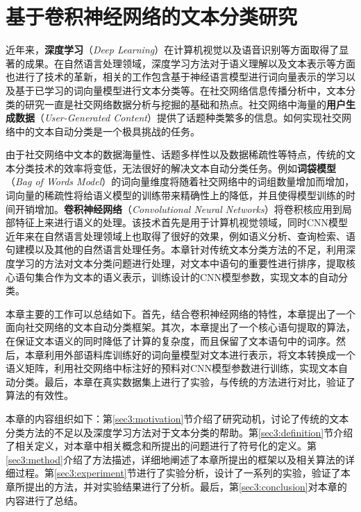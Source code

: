 \chapter{基于卷积神经网络的文本分类研究}
近年来，\textbf{深度学习}（\textit{Deep Learning}）在计算机视觉以及语音识别等方面取得了显著的成果。在自然语言处理领域，深度学习方法对于语义理解以及文本表示等方面也进行了技术的革新，相关的工作包含基于神经语言模型进行词向量表示的学习以及基于已学习的词向量模型进行文本分类等。在社交网络信息传播分析中，文本分类的研究一直是社交网络数据分析与挖掘的基础和热点。社交网络中海量的\textbf{用户生成数据}（\textit{User-Generated Content}）提供了话题种类繁多的信息。如何实现社交网络中的文本自动分类是一个极具挑战的任务。

由于社交网络中文本的数据海量性、话题多样性以及数据稀疏性等特点，传统的文本分类技术的效率将变低，无法很好的解决文本自动分类任务。例如\textbf{词袋模型}（\textit{Bag of Words Model}）的词向量维度将随着社交网络中的词组数量增加而增加，词向量的稀疏性将给语义模型的训练带来精确性上的降低，并且使得模型训练的时间开销增加。\textbf{卷积神经网络}（\textit{Convolutional Neural Networks}）将卷积核应用到局部特征上来进行语义的处理。该技术首先是用于计算机视觉领域，同时CNN模型近年来在自然语言处理领域上也取得了很好的效果，例如语义分析、查询检索、语句建模以及其他的自然语言处理任务。本章针对传统文本分类方法的不足，利用深度学习的方法对文本分类问题进行处理，对文本中语句的重要性进行排序，提取核心语句集合作为文本的语义表示，训练设计的CNN模型参数，实现文本的自动分类。

本章主要的工作可以总结如下。首先，结合卷积神经网络的特性，本章提出了一个面向社交网络的文本自动分类框架。其次，本章提出了一个核心语句提取的算法，在保证文本语义的同时降低了计算的复杂度，而且保留了文本语句中的词序。然后，本章利用外部语料库训练好的词向量模型对文本进行表示，将文本转换成一个语义矩阵，利用社交网络中标注好的预料对CNN模型参数进行训练，实现文本自动分类。最后，本章在真实数据集上进行了实验，与传统的方法进行对比，验证了算法的有效性。

本章的内容组织如下：第\ref{sec3:motivation}节介绍了研究动机，讨论了传统的文本分类方法的不足以及深度学习方法对于文本分类的帮助。第\ref{sec3:definition}节介绍了相关定义，对本章中相关概念和所提出的问题进行了符号化的定义。第\ref{sec3:method}介绍了方法描述，详细地阐述了本章所提出的框架以及相关算法的详细过程。第\ref{sec3:experiment}节进行了实验分析，设计了一系列的实验，验证了本章所提出的方法，并对实验结果进行了分析。最后，第\ref{sec3:conclusion}对本章的内容进行了总结。
